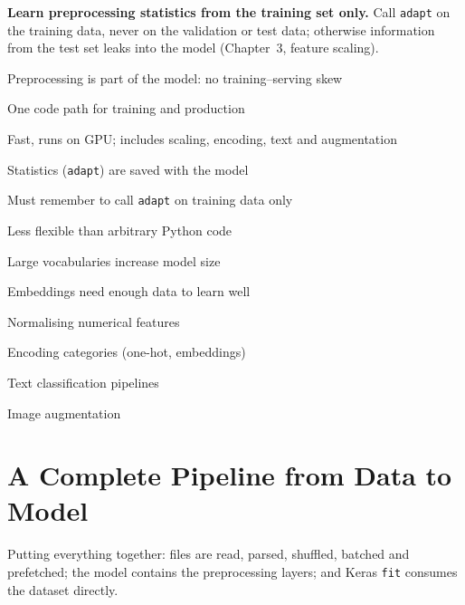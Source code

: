 \begin{warning}
\textbf{Learn preprocessing statistics from the training set only.} Call \texttt{adapt} on the training data, never on the validation or test data; otherwise information from the test set leaks into the model (Chapter~3, feature scaling).
\end{warning}

{\item Preprocessing is part of the model: no training--serving skew
 \item One code path for training and production
 \item Fast, runs on GPU; includes scaling, encoding, text and augmentation
 \item Statistics (\texttt{adapt}) are saved with the model}
{\item Must remember to call \texttt{adapt} on training data only
 \item Less flexible than arbitrary Python code
 \item Large vocabularies increase model size
 \item Embeddings need enough data to learn well}
{\item Normalising numerical features
 \item Encoding categories (one-hot, embeddings)
 \item Text classification pipelines
 \item Image augmentation}

\section{A Complete Pipeline from Data to Model}

Putting everything together: files are read, parsed, shuffled, batched and prefetched; the model contains the preprocessing layers; and Keras \texttt{fit} consumes the dataset directly.

